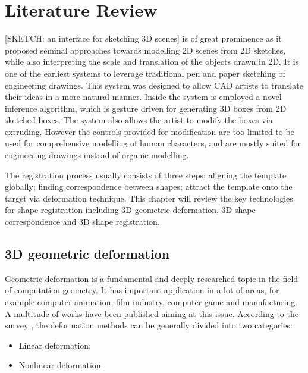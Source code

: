 \ifx\isEmbedded\undefined


\fi
\chapter{Literature Review}
\label{chap:literature}
[SKETCH: an interface for sketching 3D scenes] is of great prominence as it proposed seminal approaches towards modelling 2D scenes from 2D sketches, while also interpreting the scale and translation of the objects drawn in 2D. It is one of the earliest systems to leverage traditional pen and paper sketching of engineering drawings. This system was designed to allow CAD artists to translate their ideas in a more natural manner. Inside the system is employed a novel inference algorithm, which is gesture driven for generating 3D boxes from 2D sketched boxes. The system also allows the artist to modify the boxes via extruding. However the controls provided for modification are too limited to be used for comprehensive modelling of human characters, and are mostly suited for engineering drawings instead of organic modelling.







The registration process usually consists of three steps: aligning the template globally; finding correspondence between shapes; attract the template onto the target via deformation technique. This chapter will review the key technologies for shape registration including 3D geometric deformation, 3D shape correspondence and 3D shape registration.

\section{3D geometric deformation}
 Geometric deformation is a fundamental and deeply researched topic in the field of computation geometry. It has important application in a lot of areas, for example computer animation, film industry, computer game and manufacturing. A multitude of works have been published aiming at this issue. According to the survey \cite{botsch2008linear}, the deformation methods can be generally divided into two categories:
 \begin{itemize}
\item Linear deformation;
\item Nonlinear deformation.
\end{itemize}

